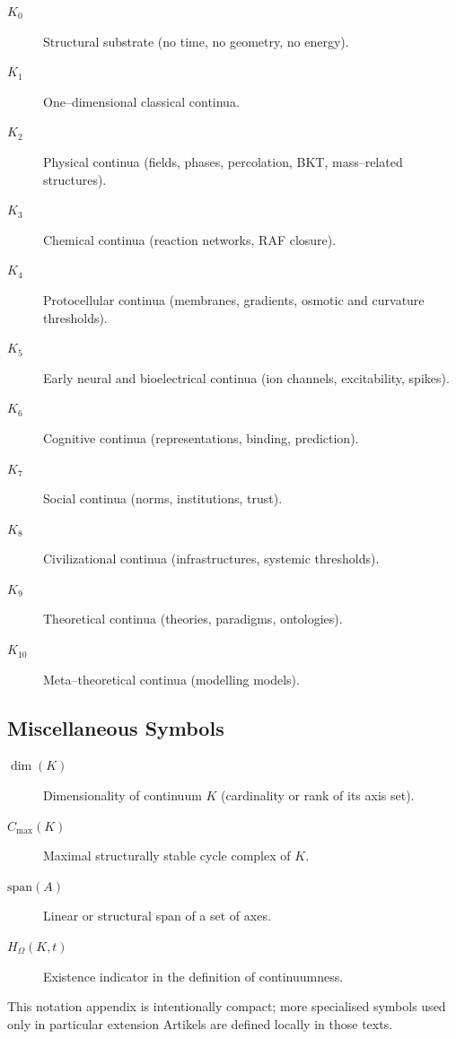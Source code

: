 \begin{description}
  \item[\(K_0\)] Structural substrate (no time, no geometry, no energy).
  \item[\(K_1\)] One--dimensional classical continua.
  \item[\(K_2\)] Physical continua (fields, phases, percolation, BKT,
        mass--related structures).
  \item[\(K_3\)] Chemical continua (reaction networks, RAF closure).
  \item[\(K_4\)] Protocellular continua (membranes, gradients, osmotic and
        curvature thresholds).
  \item[\(K_5\)] Early neural and bioelectrical continua (ion channels,
        excitability, spikes).
  \item[\(K_6\)] Cognitive continua (representations, binding, prediction).
  \item[\(K_7\)] Social continua (norms, institutions, trust).
  \item[\(K_8\)] Civilizational continua (infrastructures, systemic
        thresholds).
  \item[\(K_9\)] Theoretical continua (theories, paradigms, ontologies).
  \item[\(K_{10}\)] Meta--theoretical continua (modelling models).
\end{description}

\subsection{Miscellaneous Symbols}

\begin{description}
  \item[\(\dim(K)\)] Dimensionality of continuum \(K\) (cardinality or rank of
        its axis set).
  \item[\(C_{\max}(K)\)] Maximal structurally stable cycle complex of \(K\).
  \item[\(\mathrm{span}(A)\)] Linear or structural span of a set of axes.
  \item[\(H_{\Omega}(K,t)\)] Existence indicator in the definition of
        continuumness.
\end{description}

This notation appendix is intentionally compact; more specialised symbols used
only in particular extension Artikels are defined locally in those texts.
